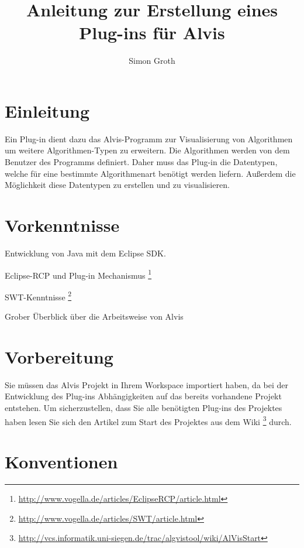 \documentclass[10pt,a4paper]{article}
\author{Simon Groth}
\title{Anleitung zur Erstellung eines Plug-ins für Alvis}
\begin{document}
\maketitle

\tableofcontents

\section{Einleitung}
Ein Plug-in dient dazu das Alvis-Programm zur Visualisierung von Algorithmen um weitere Algorithmen-Typen zu erweitern. Die Algorithmen werden von dem Benutzer des Programms definiert. Daher muss das Plug-in die Datentypen, welche für eine bestimmte Algorithmenart benötigt werden liefern. Außerdem die Möglichkeit diese Datentypen zu erstellen und zu visualisieren.
\section{Vorkenntnisse}
\begin{list}{-}{Sie sollten über diese Kenntnisse verfügen.}
\item Entwicklung von Java mit dem Eclipse SDK.
\item Eclipse-RCP und Plug-in Mechanismus
\footnote{\href{http://www.vogella.de/articles/EclipseRCP/article.html}{http://www.vogella.de/articles/EclipseRCP/article.html}} 
\item SWT-Kenntnisse
\footnote{\href{http://www.vogella.de/articles/SWT/article.html}{http://www.vogella.de/articles/SWT/article.html}}
\item Grober Überblick über die Arbeitsweise von Alvis
\end{list}
\section{Vorbereitung}
Sie müssen das Alvis Projekt in Ihrem Workspace importiert haben, da bei der Entwicklung des Plug-ins Abhängigkeiten auf das bereits vorhandene Projekt entstehen. Um sicherzustellen, dass Sie alle benötigten Plug-ins des Projektes haben lesen Sie sich den Artikel zum Start des Projektes aus dem Wiki
\footnote{\href{http://vcs.informatik.uni-siegen.de/trac/algvistool/wiki/AlVisStart}{http://vcs.informatik.uni-siegen.de/trac/algvistool/wiki/AlVisStart}}
 durch.
\section{Konventionen}
\end{document}
